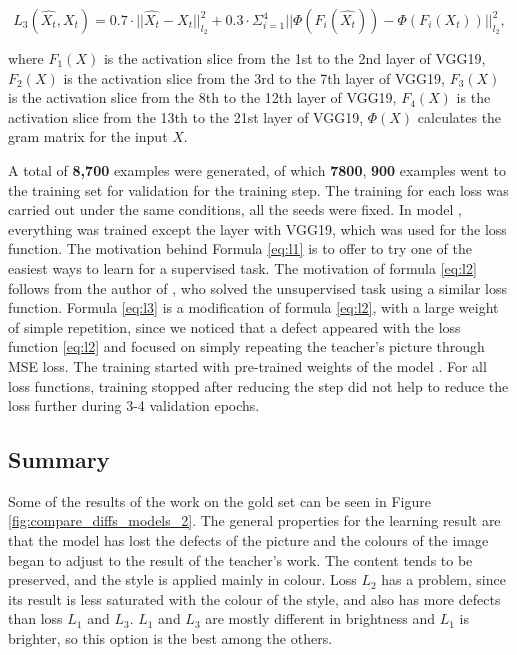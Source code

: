 \documentclass{article}
\begin{document}
\begin{equation}\label{eq:l3} L_{3}(\hat{X_{t}}, X_{t}) = 0.7 \cdot||\hat{X_{t}} - X_{t} ||^2_{l_2} + 0.3 \cdot \Sigma_{i=1}^{4}||\Phi(F_{i}(\hat{X_{t}})) - \Phi(F_{i}(X_{t}))||^2_{l_2}, \end{equation}

where $F_{1}(X)$ is the activation slice from the 1st to the 2nd layer of VGG19, $F_{2}(X)$ is the activation slice from the 3rd to the 7th layer of VGG19, $F_{3}(X)$ is the activation slice from the 8th to the 12th layer of VGG19, $F_{4}(X)$ is the activation slice from the 13th to the 21st layer of VGG19, $\Phi(X)$ calculates the gram matrix for the input $X$. 

A total of \textbf{8,700} examples were generated, of which \textbf{7800}, \textbf{900} examples went to the training set for validation for the training step. The training for each loss was carried out under the same conditions, all the seeds were fixed. In model \cite{method 5}, everything was trained except the layer with VGG19, which was used for the loss function. The motivation behind Formula \ref{eq:l1} is to offer to try one of the easiest ways to learn for a supervised task. The motivation of formula \ref{eq:l2} follows from the author of \cite{method 5}, who solved the unsupervised task using a similar loss function. Formula \ref{eq:l3} is a modification of formula \ref{eq:l2}, with a large weight of simple repetition, since we noticed that a defect appeared with the loss function \ref{eq:l2} and focused on simply repeating the teacher's picture through MSE loss. The training started with pre-trained weights of the model \cite{method 5}. For all loss functions, training stopped after reducing the step did not help to reduce the loss further during 3-4 validation epochs.

\subsection{Summary}
Some of the results of the work on the gold set can be seen in Figure \ref{fig:compare_diffs_models_2}. The general properties for the learning result are that the model has lost the defects of the picture and the colours of the image began to adjust to the result of the teacher's work. The content tends to be preserved, and the style is applied mainly in colour. Loss $L_{2}$ has a problem, since its result is less saturated with the colour of the style, and also has more defects than loss $L_1$ and $L_3$. $L_1$ and $L_3$ are mostly different in brightness and $L_1$ is brighter, so this option is the best among the others.
\end{document}

